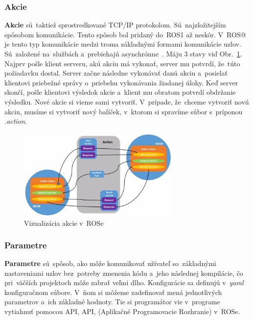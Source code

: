 \subsubsection{Akcie}
\label{sec:actions}
	\textbf {Akcie} sú~taktiež sprostredkované TCP/IP protokolom. Sú~najzložitejším spôsobom
	komunikácie. Tento spôsob bol pridaný do~ROS1 až neskôr. V~ROS@ je tento
	typ komunikácie medzi troma základnými formami komunikácie uzlov. Sú~založené na~službách
	a~prebiehajú asynchrónne~\cite{ROS2book}. Máju 3 stavy viď Obr.~\ref{fig:action}.
	Najprv pošle klient serveru, akú akciu má vykonať, server mu potvrdí, že~túto požiadavku
	dostal. Server začne následne vykonávať danú akciu a~posielať klientovi priebežné správy
	o~priebehu vykonávania žiadanej úlohy. Keď server skončí, pošle klientovi výsledok akcie
	a~klient mu obratom potvrdí obdržanie výsledku. Nové akcie si vieme sami vytvoriť.
	V~prípade, že~chceme vytvoriť novú akciu, musíme si vytvoriť nový balíček, v~ktorom
	si spravíme súbor s~príponou \textit{.action}.

\clearpage

	\begin{figure}[!htbp]
		\centering
		\includegraphics[width=8cm]{img/actionExplanation.png}
		\caption{Vizualizácia akcie v~ROSe~\cite{RosDoc}}
		\label{fig:action}
	\end{figure}

\subsubsection{Parametre}
\label{sec:parametre}

\textbf{Parametre} sú~spôsob, ako môže komunikovať užívateľ so~základnými nastaveniami uzlov
bez~potreby zmenenia kódu a~jeho následnej kompilácie, čo pri~väčších projektoch môže zabrať
veľmi dlho. Konfigurácie sa definujú v~\textit{yaml} konfiguračnom súbore. V~ňom si
môžeme zadefinovať mená jednotlivých parametrov a~ich základné hodnoty. Tie si programátor
vie v~programe vytiahnuť pomocou API, \acrlong{API}, (Aplikačné Programovacie Rozhranie) v~ROSe.

